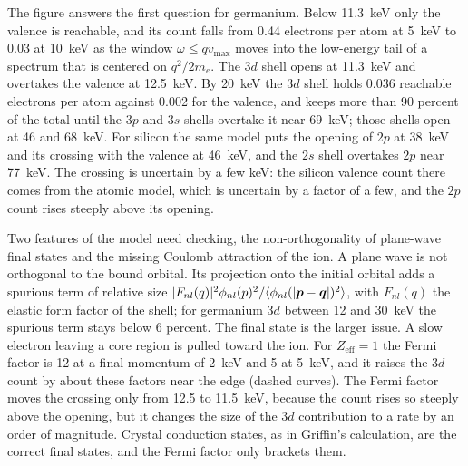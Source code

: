 The figure answers the first question for germanium. Below \SI{11.3}{keV} only the valence is reachable, and its count falls from 0.44 electrons per atom at \SI{5}{keV} to 0.03 at \SI{10}{keV} as the window $\omega \le qv_{\mathrm{max}}$ moves into the low-energy tail of a spectrum that is centered on $q^2/2m_e$. The $3d$ shell opens at \SI{11.3}{keV} and overtakes the valence at \SI{12.5}{keV}. By \SI{20}{keV} the $3d$ shell holds 0.036 reachable electrons per atom against 0.002 for the valence, and keeps more than 90 percent of the total until the $3p$ and $3s$ shells overtake it near \SI{69}{keV}; those shells open at 46 and \SI{68}{keV}. For silicon the same model puts the opening of $2p$ at \SI{38}{keV} and its crossing with the valence at \SI{46}{keV}, and the $2s$ shell overtakes $2p$ near \SI{77}{keV}. The crossing is uncertain by a few keV: the silicon valence count there comes from the atomic model, which is uncertain by a factor of a few, and the $2p$ count rises steeply above its opening.

Two features of the model need checking, the non-orthogonality of plane-wave final states and the missing Coulomb attraction of the ion. A plane wave is not orthogonal to the bound orbital. Its projection onto the initial orbital adds a spurious term of relative size $|F_{nl}(q)|^2\phi_{nl}(p)^2/\langle\phi_{nl}(|\bm{p} - \bm{q}|)^2\rangle$, with $F_{nl}(q)$ the elastic form factor of the shell; for germanium $3d$ between 12 and \SI{30}{keV} the spurious term stays below 6 percent. The final state is the larger issue. A slow electron leaving a core region is pulled toward the ion. For $Z_{\mathrm{eff}} = 1$ the Fermi factor is 12 at a final momentum of \SI{2}{keV} and 5 at \SI{5}{keV}, and it raises the $3d$ count by about these factors near the edge (dashed curves). The Fermi factor moves the crossing only from 12.5 to \SI{11.5}{keV}, because the count rises so steeply above the opening, but it changes the size of the $3d$ contribution to a rate by an order of magnitude. Crystal conduction states, as in Griffin's calculation, are the correct final states, and the Fermi factor only brackets them.

